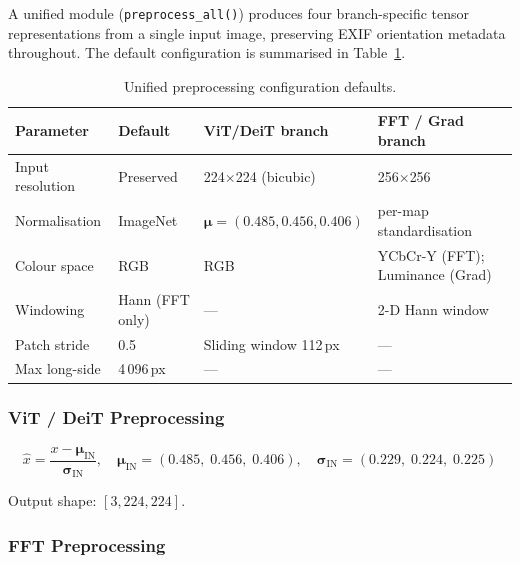 \documentclass[12pt, a4paper]{article}
\begin{document}
A unified module (\texttt{preprocess\_all()}) produces four branch-specific tensor
representations from a single input image, preserving EXIF orientation metadata
throughout.  The default configuration is summarised in Table~\ref{tab:preprocconfig}.

\begin{table}[H]
\centering
\caption{Unified preprocessing configuration defaults.}
\label{tab:preprocconfig}
\begin{tabular}{llll}
\toprule
\textbf{Parameter} & \textbf{Default} & \textbf{ViT/DeiT branch} & \textbf{FFT / Grad branch} \\
\midrule
Input resolution     & Preserved & 224$\times$224 (bicubic) & 256$\times$256 \\
Normalisation        & ImageNet & $\boldsymbol{\mu}=(0.485, 0.456, 0.406)$ & per-map standardisation \\
Colour space         & RGB & RGB & YCbCr-Y (FFT); Luminance (Grad) \\
Windowing            & Hann (FFT only) & — & 2-D Hann window \\
Patch stride         & 0.5 & Sliding window 112\,px & — \\
Max long-side        & 4\,096\,px & — & — \\
\bottomrule
\end{tabular}
\end{table}

\subsubsection{ViT / DeiT Preprocessing}

\begin{equation}
  \hat{x} = \frac{x - \boldsymbol{\mu}_{\mathrm{IN}}}{\boldsymbol{\sigma}_{\mathrm{IN}}},
  \quad
  \boldsymbol{\mu}_{\mathrm{IN}} = (0.485,\;0.456,\;0.406),
  \quad
  \boldsymbol{\sigma}_{\mathrm{IN}} = (0.229,\;0.224,\;0.225)
  \label{eq:imagenet_norm}
\end{equation}

Output shape: $[3, 224, 224]$.

\subsubsection{FFT Preprocessing}
\end{document}
